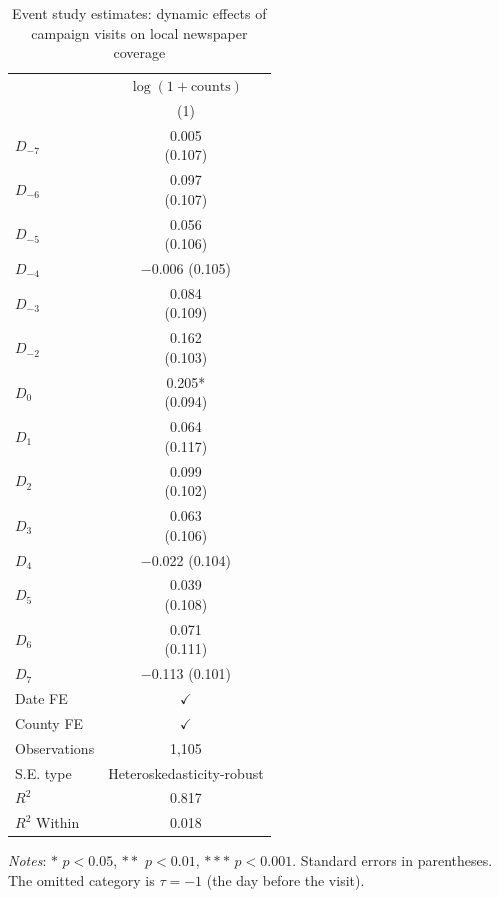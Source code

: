 \documentclass{article}
\begin{document}
\begin{table}[htbp]
\centering
\caption{Event study estimates: dynamic effects of campaign visits on local newspaper
coverage}
\label{tab:eventstudy}
\renewcommand\cellalign{t}
\begin{threeparttable}
\begin{tabular}{lc}
\toprule
 & $\log(1+\text{counts})$ \\
 & (1) \\
\midrule
\addlinespace
$D_{-7}$ & \makecell{0.005 \\ (0.107)} \\
$D_{-6}$ & \makecell{0.097 \\ (0.107)} \\
$D_{-5}$ & \makecell{0.056 \\ (0.106)} \\
$D_{-4}$ & \makecell{$-$0.006 \\ (0.105)} \\
$D_{-3}$ & \makecell{0.084 \\ (0.109)} \\
$D_{-2}$ & \makecell{0.162 \\ (0.103)} \\
$D_{0}$  & \makecell{0.205* \\ (0.094)} \\
$D_{1}$  & \makecell{0.064 \\ (0.117)} \\
$D_{2}$  & \makecell{0.099 \\ (0.102)} \\
$D_{3}$  & \makecell{0.063 \\ (0.106)} \\
$D_{4}$  & \makecell{$-$0.022 \\ (0.104)} \\
$D_{5}$  & \makecell{0.039 \\ (0.108)} \\
$D_{6}$  & \makecell{0.071 \\ (0.111)} \\
$D_{7}$  & \makecell{$-$0.113 \\ (0.101)} \\
\midrule
\addlinespace
Date FE        & $\checkmark$ \\
County FE      & $\checkmark$ \\
\midrule
\addlinespace
Observations   & 1,105 \\
S.E. type      & Heteroskedasticity-robust \\
$R^2$          & 0.817 \\
$R^2$ Within   & 0.018 \\
\bottomrule
\end{tabular}
\begin{tablenotes}
\footnotesize
\item \textit{Notes}: $*$ $p<0.05$, $**$ $p<0.01$, $***$ $p<0.001$.
      Standard errors in parentheses.
      The omitted category is $\tau = -1$ (the day before the visit).
\end{tablenotes}
\end{threeparttable}
\end{table}
\end{document}
